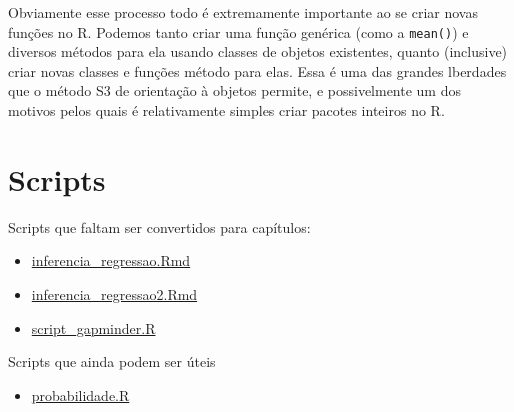 \documentclass[
  10pt,
  a4paper]{book}
\providecommand{\tightlist}{%
  \setlength{\itemsep}{0pt}\setlength{\parskip}{0pt}}
\begin{document}
Obviamente esse processo todo é extremamente importante ao se criar
novas funções no R. Podemos tanto criar uma função genérica (como a
\texttt{mean()}) e diversos métodos para ela usando classes de objetos
existentes, quanto (inclusive) criar novas classes e funções método para
elas. Essa é uma das grandes lberdades que o método S3 de orientação à
objetos permite, e possivelmente um dos motivos pelos quais é
relativamente simples criar pacotes inteiros no R.

\hypertarget{scripts}{%
\chapter{Scripts}\label{scripts}}

Scripts que faltam ser convertidos para capítulos:

\begin{itemize}
\tightlist
\item
  \href{scripts/inferencia_regressao.Rmd}{inferencia\_regressao.Rmd}
\item
  \href{scripts/inferencia_regressao2.Rmd}{inferencia\_regressao2.Rmd}
\item
  \href{scripts/script_gapminder.R}{script\_gapminder.R}
\end{itemize}

Scripts que ainda podem ser úteis

\begin{itemize}
\tightlist
\item
  \href{scripts/probabilidade.R}{probabilidade.R}
\end{itemize}
\end{document}
